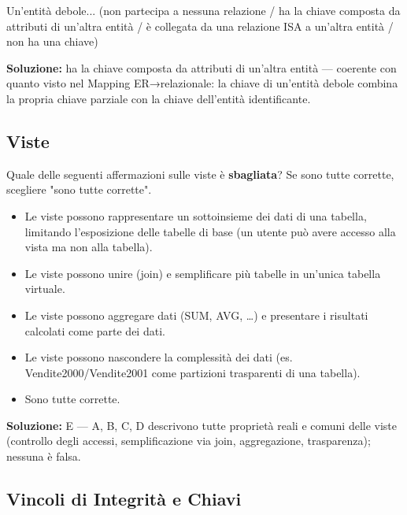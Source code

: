 \documentclass[12pt, a4paper]{article}
\begin{document}
\begin{tcolorbox}[colback=lightergray!10, colframe=tocsec, title=\textbf{Esercizio 14}]
Un'entità debole... (non partecipa a nessuna relazione / ha la chiave composta da attributi di un'altra entità / è collegata da una relazione ISA a un'altra entità / non ha una chiave)
\end{tcolorbox}
\textbf{Soluzione:} ha la chiave composta da attributi di un'altra entità — coerente con quanto visto nel Mapping ER→relazionale: la chiave di un'entità debole combina la propria chiave parziale con la chiave dell'entità identificante.

\subsection{Viste}

\begin{tcolorbox}[colback=lightergray!10, colframe=tocsec, title=\textbf{Esercizio 15}]
Quale delle seguenti affermazioni sulle viste è \textbf{sbagliata}? Se sono tutte corrette, scegliere "sono tutte corrette".
\begin{itemize}
    \item[A.] Le viste possono rappresentare un sottoinsieme dei dati di una tabella, limitando l'esposizione delle tabelle di base (un utente può avere accesso alla vista ma non alla tabella).
    \item[B.] Le viste possono unire (join) e semplificare più tabelle in un'unica tabella virtuale.
    \item[C.] Le viste possono aggregare dati (SUM, AVG, \ldots) e presentare i risultati calcolati come parte dei dati.
    \item[D.] Le viste possono nascondere la complessità dei dati (es. Vendite2000/Vendite2001 come partizioni trasparenti di una tabella).
    \item[E.] Sono tutte corrette.
\end{itemize}
\end{tcolorbox}
\textbf{Soluzione:} E — A, B, C, D descrivono tutte proprietà reali e comuni delle viste (controllo degli accessi, semplificazione via join, aggregazione, trasparenza); nessuna è falsa.

\subsection{Vincoli di Integrità e Chiavi}
\end{document}
